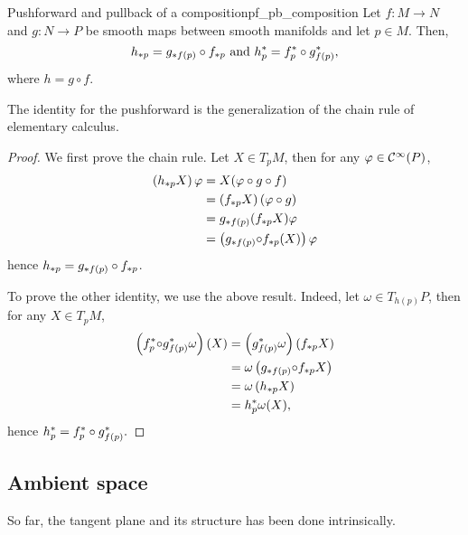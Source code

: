 \begin{theorem}{Pushforward and pullback of a composition}{pf_pb_composition}
    Let \(f : M \to N\) and \(g : N \to P\) be smooth maps between smooth manifolds and let \(p \in M\). Then,
    \begin{equation*}
        \pf[p]{h} = \pf[f(p)]{g} \circ \pf[p]{f} \text{ and }\pb[p]{h} = \pb[p]{f} \circ \pb[f(p)]{g},
    \end{equation*}
    where \(h = g \circ f\).
\end{theorem}
\begin{remark}
    The identity for the pushforward is the generalization of the chain rule of elementary calculus.
\end{remark}
\begin{proof}
    We first prove the chain rule. Let \(X \in T_pM\), then for any \(\varphi \in \smooth{P}\),
    \begin{align*}
        \left(\pf[p]{h}{X}\right)\varphi &= X(\varphi \circ g \circ f)\\
                                         &= \left(\pf[p]{f}{X}\right)(\varphi \circ g)\\
                                         &= \pf[f(p)]{g}{\left(\pf[p]{f}{X}\right)}\varphi\\
                                         &= \left(\pf[f(p)]{g}{\circ\pf[p]{f}{(X)}}\right)\varphi
    \end{align*}
    hence \(\pf[p]{h} = \pf[f(p)]{g} \circ \pf[p]{f}\).

    To prove the other identity, we use the above result. Indeed, let \(\omega \in T_{h(p)}P\), then for any \(X \in T_pM\),
    \begin{align*}
        \left(\pb[p]{f}{\circ \pb[f(p)]{g}{\omega}}\right)(X) &= \left(\pb[f(p)]{g}{\omega}\right)\left(\pf[p]{f}{X}\right)\\
                                                              &= \omega \left(\pf[f(p)]{g}{\circ \pf[p]{f}{X}}\right)\\
                                                              &= \omega \left(\pf[p]{h}{X}\right)\\
                                                              &= \pb[p]{h}{\omega}(X),
    \end{align*}
    hence \(\pb[p]{h} = \pb[p]{f} \circ \pb[f(p)]{g}.\)
\end{proof}

\subsection{Ambient space}
So far, the tangent plane and its structure has been done intrinsically.

